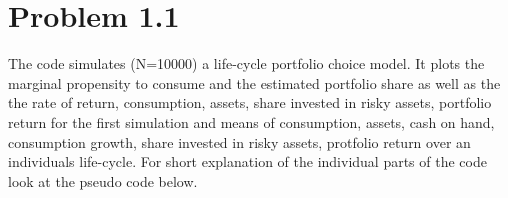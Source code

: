\documentclass[12pt,a4paper]{article}
\begin{document}
\newpage


\section*{Problem 1.1}

The code simulates (N=10000) a life-cycle portfolio choice model. It plots the marginal propensity to consume and the estimated portfolio share as well as the the rate of return, consumption, assets, share invested in risky assets, portfolio return for the first simulation and means of consumption, assets, cash on hand, consumption growth, share invested in risky assets, protfolio return over an individuals life-cycle. For short explanation of the individual parts of the code look at the pseudo code below.
\end{document}
